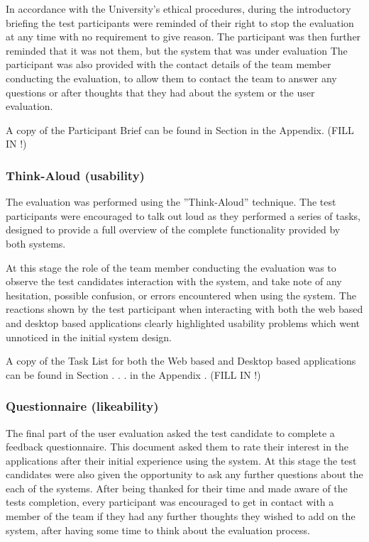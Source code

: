 In accordance with the University's ethical procedures, during the introductory 
briefing the test participants were reminded of their right to stop the 
evaluation at any time with no requirement to give reason. The participant was 
then further reminded that it was not them, but the system that was under 
evaluation The participant was also provided with the contact details of the 
team member conducting the evaluation, to allow them to contact the team to 
answer any questions or after thoughts that they had about the system or the 
user evaluation.

A copy of the Participant Brief can be found in Section in the Appendix. (FILL 
IN !) 

\subsubsection{Think-Aloud (usability)}

The evaluation was performed using the ”Think-Aloud” technique. The test 
participants were encouraged to talk out loud as they performed a series of 
tasks, designed to provide a full overview of the complete functionality 
provided by both systems. 

At this stage the role of the team member conducting the evaluation was to 
observe the test candidates interaction with the system, and take note of any 
hesitation, possible confusion, or errors encountered when using the system. 
The reactions shown by the test participant when interacting with both the web 
based and desktop based applications clearly highlighted usability problems 
which went unnoticed in the initial system design. 

A copy of the Task List for both the Web based and Desktop based applications can be found in Section . . .  in the Appendix . (FILL IN !) 

\subsubsection{Questionnaire (likeability)}

The final part of the user evaluation asked the test candidate to complete a 
feedback questionnaire. This document asked them to rate their interest in the 
applications after their initial experience using the system. At this stage the 
test candidates were also given the opportunity to ask any further questions 
about the each of the systems. After being thanked for their time and made 
aware of the tests completion, every participant was encouraged to get in 
contact with a member of the team if they had any further thoughts they wished 
to add on the system, after having some time to think about the evaluation 
process.

